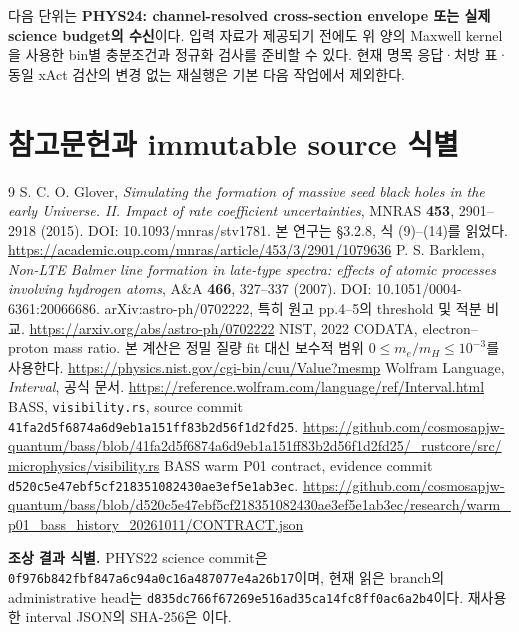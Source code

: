 \documentclass[11pt,a4paper]{article}
\begin{document}
다음 단위는 \textbf{PHYS24: channel-resolved cross-section envelope 또는 실제 science budget의 수신}이다. 입력 자료가 제공되기 전에도 위 양의 Maxwell kernel을 사용한 bin별 충분조건과 정규화 검사를 준비할 수 있다. 현재 명목 응답·처방 표·동일 xAct 검산의 변경 없는 재실행은 기본 다음 작업에서 제외한다.

\newpage
\section*{참고문헌과 immutable source 식별}
\begin{thebibliography}{9}
 S. C. O. Glover, \emph{Simulating the formation of massive seed black holes in the early Universe. II. Impact of rate coefficient uncertainties}, MNRAS \textbf{453}, 2901--2918 (2015). DOI: 10.1093/mnras/stv1781. 본 연구는 \S3.2.8, 식 (9)--(14)를 읽었다.\newline
\url{https://academic.oup.com/mnras/article/453/3/2901/1079636}
 P. S. Barklem, \emph{Non-LTE Balmer line formation in late-type spectra: effects of atomic processes involving hydrogen atoms}, A\&A \textbf{466}, 327--337 (2007). DOI: 10.1051/0004-6361:20066686. arXiv:astro-ph/0702222, 특히 원고 pp.4--5의 threshold 및 적분 비교.\newline
\url{https://arxiv.org/abs/astro-ph/0702222}
 NIST, 2022 CODATA, electron--proton mass ratio. 본 계산은 정밀 질량 fit 대신 보수적 범위 $0\le m_e/m_H\le10^{-3}$를 사용한다.\newline
\url{https://physics.nist.gov/cgi-bin/cuu/Value?mesmp}
 Wolfram Language, \emph{Interval}, 공식 문서.\newline
\url{https://reference.wolfram.com/language/ref/Interval.html}
 BASS, \texttt{visibility.rs}, source commit
\texttt{41fa2d5f6874a6d9eb1a151ff83b2d56f1d2fd25}.\newline
\url{https://github.com/cosmosapjw-quantum/bass/blob/41fa2d5f6874a6d9eb1a151ff83b2d56f1d2fd25/_rustcore/src/microphysics/visibility.rs}
 BASS warm P01 contract, evidence commit
\texttt{d520c5e47ebf5cf218351082430ae3ef5e1ab3ec}.\newline
\url{https://github.com/cosmosapjw-quantum/bass/blob/d520c5e47ebf5cf218351082430ae3ef5e1ab3ec/research/warm_p01_bass_history_20261011/CONTRACT.json}
\end{thebibliography}
\textbf{조상 결과 식별.} PHYS22 science commit은
\texttt{0f976b842fbf847a6c94a0c16a487077e4a26b17}이며, 현재 읽은 branch의 administrative head는
\texttt{d835dc766f67269e516ad35ca14fc8ff0ac6a2b4}이다. 재사용한 interval JSON의 SHA-256은
이다.
\end{document}
